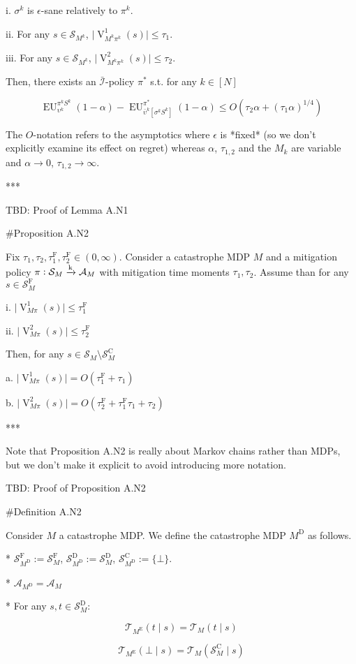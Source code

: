 \documentclass[a4paper]{article}
\newcommand{\AP}[1]{\left(#1\right)}
\newcommand{\AB}[1]{\left[#1\right]}
\newcommand{\Abs}[1]{\lvert #1 \rvert}
\newcommand{\M}{\xrightarrow{\textnormal{k}}}
\newcommand{\A}{\mathcal{A}}
\newcommand{\St}{\mathcal{S}}
\newcommand{\T}{\mathcal{T}}
\newcommand{\In}{\mathcal{I}}
\newcommand{\Adi}{{\bar{\In}}}
\newcommand{\RMC}{\mathrm{C}}
\newcommand{\RMD}{\mathrm{D}}
\newcommand{\RME}{\mathrm{E}}
\newcommand{\RMF}{\mathrm{F}}
\newcommand{\SF}{\St^{\RMF}}
\newcommand{\SD}{\St^{\RMD}}
\newcommand{\SC}{\St^{\RMC}}
\newcommand{\MD}{M^{\RMD}}
\newcommand{\ME}{M^{\RME}}
\newcommand{\TF}{\tau^{\RMF}}
\newcommand{\V}{\operatorname{V}}
\newcommand{\EU}{\operatorname{EU}}
\begin{document}
i. $\sigma^k$ is $\epsilon$-sane relatively to $\pi^k$.

ii. For any $s \in \St_{M^k}$, $\Abs{\V^1_{M^k\pi^k}(s)} \leq \tau_1$.

iii. For any $s \in \St_{M^k}$, $\Abs{\V^2_{M^k\pi^k}(s)} \leq \tau_2$.

Then, there exists an $\Adi$-policy $\pi^*$ s.t. for any $k \in [N]$

$$\EU_{\upsilon^k}^{\pi^k S^k}(1-\alpha) - \EU_{\bar{\upsilon}^k\AB{\sigma^k S^k}}^{\pi^*}(1-\alpha) \leq O\AP{\tau_2 \alpha + (\tau_1 \alpha)^{1/4}}$$

The $O$-notation refers to the asymptotics where $\epsilon$ is *fixed* (so we don't explicitly examine its effect on regret) whereas $\alpha$, $\tau_{1,2}$ and the $M_k$ are variable and $\alpha \rightarrow 0$, $\tau_{1,2} \rightarrow \infty$.

***

TBD: Proof of Lemma A.N1 %

\#Proposition A.N2

Fix $\tau_1, \tau_2, \TF_1, \TF_2 \in (0,\infty)$. Consider a catastrophe MDP $M$ and a mitigation policy $\pi: \St_M \M \A_M$ with mitigation time moments $\tau_1, \tau_2$. Assume than for any $s \in \SF_M$

i. $\Abs{\V^1_{M\pi}(s)} \leq \TF_1$

ii. $\Abs{\V^2_{M\pi}(s)} \leq \TF_2$

Then, for any $s \in \St_M \setminus \SC_M$

a. $\Abs{\V^1_{M\pi}(s)} = O\AP{\TF_1 + \tau_1}$

b. $\Abs{\V^2_{M\pi}(s)} = O\AP{\TF_2 + \TF_1 \tau_1 + \tau_2}$

***

Note that Proposition A.N2 is really about Markov chains rather than MDPs, but we don't make it explicit to avoid introducing more notation.

TBD: Proof of Proposition A.N2

\#Definition A.N2

Consider $M$ a catastrophe MDP. We define the catastrophe MDP $\MD$ as follows.

* $\SF_{\MD}:=\SF_M$, $\SD_{\MD}:=\SD_M$, $\SC_{\MD}:=\{\bot\}$.

* $\A_{\MD} = \A_M$

* For any $s,t \in \SD_M$:

$$\T_{\ME}(t \mid s) = \T_M(t \mid s)$$

$$\T_{\ME}(\bot \mid s) = \T_M(\SC_M \mid s)$$
\end{document}
